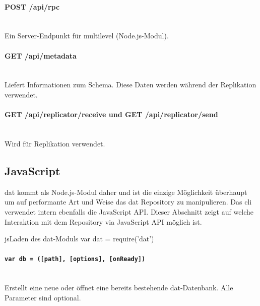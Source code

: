\paragraph{POST /api/rpc} ~\\
Ein Server-Endpunkt für multilevel (Node.js-Modul).

\paragraph{GET /api/metadata} ~\\
Liefert Informationen zum Schema. Diese Daten werden während der Replikation verwendet.

\paragraph{GET /api/replicator/receive und GET /api/replicator/send} ~\\
Wird für Replikation verwendet.

\subsection{JavaScript}
dat kommt als Node.js-Modul daher und ist die einzige Möglichkeit überhaupt um auf performante Art und Weise das \gls{dat} Repository zu manipulieren. Das \gls{cli} verwendet intern ebenfalls die JavaScript API. Dieser Abschnitt zeigt auf welche Interaktion mit dem Repository via JavaScript API möglich ist.

\begin{srclst}{js}{Laden des dat-Moduls}
var dat = require('dat')
\end{srclst}

\paragraph{\texttt{var db = ([path], [options], [onReady])}} ~\\

Erstellt eine neue oder öffnet eine bereits bestehende dat-Datenbank. Alle Parameter sind optional.

